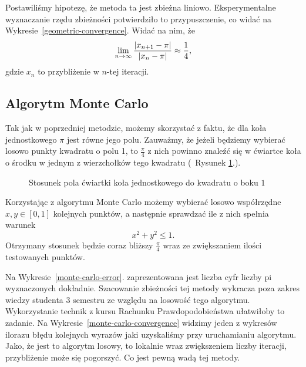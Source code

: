 Postawiliśmy hipotezę, że metoda ta jest zbieżna liniowo. Eksperymentalne wyznaczanie rzędu zbieżności potwierdziło to przypuszczenie, co widać na Wykresie~\ref{geometric-convergence}. Widać na nim, że
$$\lim_{n\to\infty}{|x_{n+1}-\pi|\over |x_n-\pi|}\approx\frac14,$$
gdzie $x_n$ to przybliżenie w $n$-tej iteracji.

\subsection{Algorytm Monte Carlo}

Tak jak w poprzedniej metodzie, możemy skorzystać z faktu, że dla koła jednostkowego $\pi$ jest równe jego polu. Zauważmy, że jeżeli będziemy wybierać losowo punkty kwadratu o polu 1, to $\frac\pi4$ z nich powinno znaleźć się w ćwiartce koła o środku w jednym z wierzchołków tego kwadratu (~Rysunek \ref{fig:monte-carlo}.).

\begin{figure}[!h]\centering
{}
\caption{Stosunek pola ćwiartki koła jednostkowego do kwadratu o boku $1$}
\label{fig:monte-carlo}
\end{figure}

Korzystając z algorytmu Monte Carlo możemy wybierać losowo współrzędne $x,y\in[0,1]$ kolejnych punktów, a następnie sprawdzać ile z nich spełnia warunek
$$x^2+y^2\leq1.$$
Otrzymany stosunek będzie coraz bliższy $\frac\pi4$ wraz ze zwiększaniem ilości testowanych punktów.

Na Wykresie~\ref{monte-carlo-error}. zaprezentowana jest liczba cyfr liczby pi wyznaczonych dokładnie. Szacowanie zbieżności tej metody wykracza poza zakres wiedzy studenta 3 semestru ze względu na losowość tego algorytmu. Wykorzystanie technik z kursu Rachunku Prawdopodobieństwa ułatwiłoby to zadanie. Na Wykresie~\ref{monte-carlo-convergence} widzimy jeden z wykresów ilorazu błędu kolejnych wyrazów jaki uzyskaliśmy przy uruchamianiu algorytmu. Jako, że jest to algorytm losowy, to lokalnie wraz zwiększeniem liczby iteracji, przybliżenie może się pogorszyć. Co jest pewną wadą tej metody.

